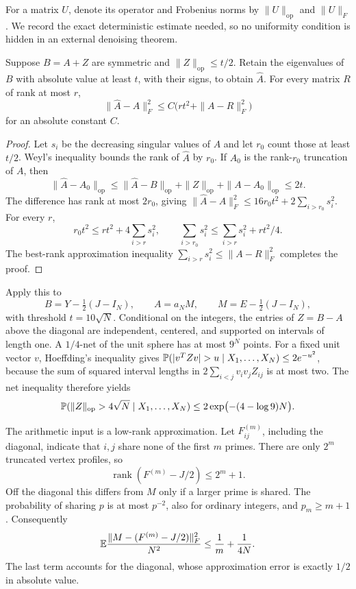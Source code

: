 For a matrix $U$, denote its operator and Frobenius norms by
$\|U\|_{\mathrm{op}}$ and $\|U\|_F$. We record the exact deterministic
estimate needed, so no uniformity condition is hidden in an external
denoising theorem.

\begin{lemma}\label{rec:svt}
Suppose $B=A+Z$ are symmetric and $\|Z\|_{\mathrm{op}}\le t/2$.
Retain the eigenvalues of $B$ with absolute value at least $t$, with
their signs, to obtain $\widehat A$. For every matrix $R$ of rank at
most $r$,
\[
 \|\widehat A-A\|_F^2
 \le C\bigl(rt^2+\|A-R\|_F^2\bigr)
\]
for an absolute constant $C$.
\end{lemma}
\begin{proof}
Let $s_i$ be the decreasing singular values of $A$ and let $r_0$ count
those at least $t/2$. Weyl's inequality bounds the rank of $\widehat A$
by $r_0$. If $A_0$ is the rank-$r_0$ truncation of $A$, then
\[
 \|\widehat A-A_0\|_{\mathrm{op}}
 \le\|\widehat A-B\|_{\mathrm{op}}+\|Z\|_{\mathrm{op}}
       +\|A-A_0\|_{\mathrm{op}}\le2t.
\]
The difference has rank at most $2r_0$, giving
$\|\widehat A-A\|_F^2\le16r_0t^2+2\sum_{i>r_0}s_i^2$.
For every $r$,
\[
 r_0t^2\le rt^2+4\sum_{i>r}s_i^2,
 \qquad
 \sum_{i>r_0}s_i^2\le\sum_{i>r}s_i^2+rt^2/4.
\]
The best-rank approximation inequality
$\sum_{i>r}s_i^2\le\|A-R\|_F^2$ completes the proof.
\end{proof}

Apply this to
\[
 B=Y-\tfrac12(J-I_N),\qquad
 A=a_NM,\qquad M=E-\tfrac12(J-I_N),
\]
with threshold $t=10\sqrt N$. Conditional on the integers, the entries
of $Z=B-A$ above the diagonal are independent, centered, and supported
on intervals of length one. A $1/4$-net of the unit sphere has at most
$9^N$ points. For a fixed unit vector $v$, Hoeffding's inequality gives
$\Prob(|v^TZv|>u\mid X_1,\ldots,X_N)\le2e^{-u^2}$, because the sum
of squared interval lengths in $2\sum_{i<j}v_iv_jZ_{ij}$ is at most
two. The net inequality therefore yields
\begin{equation}\label{rec:op-concentration}
 \mathbb P(\|Z\|_{\mathrm{op}}>4\sqrt N\mid X_1,\ldots,X_N)
 \le2\exp\bigl(-(4-\log9)N\bigr).
\end{equation}

The arithmetic input is a low-rank approximation. Let $F^{(m)}_{ij}$,
including the diagonal, indicate that $i,j$ share none of the first
$m$ primes. There are only $2^m$ truncated vertex profiles, so
\[
 \operatorname{rank}(F^{(m)}-J/2)\le2^m+1.
\]
Off the diagonal this differs from $M$ only if a larger prime is shared.
The probability of sharing $p$ is at most $p^{-2}$, also for ordinary
integers, and $p_m\ge m+1$. Consequently
\begin{equation}\label{rec:rank-tail}
 \mathbb E\frac{\|M-(F^{(m)}-J/2)\|_F^2}{N^2}
 \le\frac1m+\frac1{4N}.
\end{equation}
The last term accounts for the diagonal, whose approximation error is
exactly $1/2$ in absolute value.


